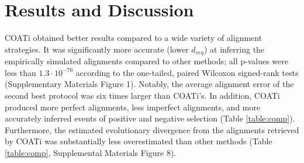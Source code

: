 \documentclass[12pt,letterpaper]{article}
\begin{document}
\section*{Results and Discussion}


COATi obtained better results compared to a wide variety of alignment strategies. It was significantly more accurate (lower $d_{seq}$) at inferring the empirically simulated alignments compared to other methods; all p-values were less than $1.3 \cdot 10^{-76}$ according to the one-tailed, paired Wilcoxon signed-rank tests (Supplementary Materials Figure 1). Notably, the average alignment error of the second best protocol was six times larger than COATi's. In addition, COATi produced more perfect alignments, less imperfect alignments, and more accurately inferred events of positive and negative selection (Table \ref{table:comp}). Furthermore, the estimated evolutionary divergence from the alignments retrieved by COATi was substantially less overestimated than other methods (Table \ref{table:comp}, Supplemental Materials Figure 8).
\end{document}
